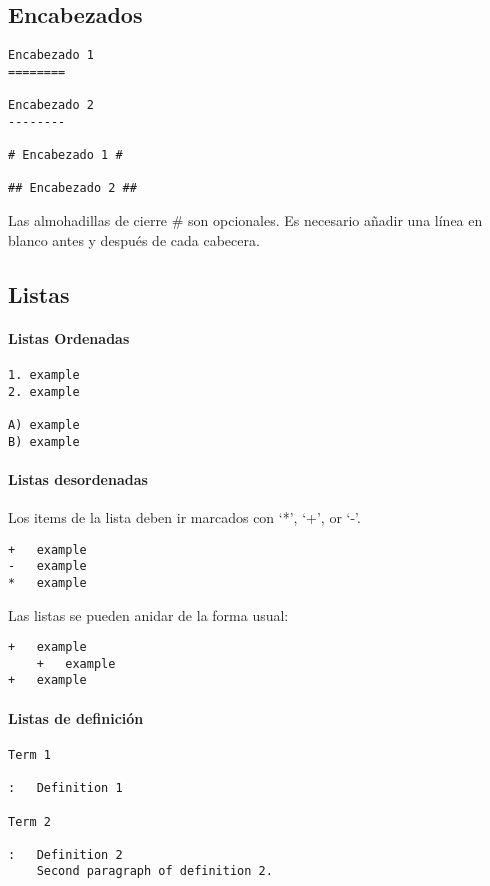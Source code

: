 \documentclass[12pt,es-ES,]{article}
\begin{document}
\subsection{Encabezados}\label{encabezados}

\begin{verbatim}
Encabezado 1
========

Encabezado 2
--------

# Encabezado 1 #

## Encabezado 2 ##
\end{verbatim}

Las almohadillas de cierre \# son opcionales. Es necesario añadir una
línea en blanco antes y después de cada cabecera.

\subsection{Listas}\label{listas}

\paragraph{Listas Ordenadas}\label{listas-ordenadas}

\begin{verbatim}
1. example
2. example

A) example
B) example
\end{verbatim}

\paragraph{Listas desordenadas}\label{listas-desordenadas}

Los items de la lista deben ir marcados con `*', `+', or `-'.

\begin{verbatim}
+   example
-   example
*   example
\end{verbatim}

Las listas se pueden anidar de la forma usual:

\begin{verbatim}
+   example
    +   example
+   example
\end{verbatim}

\paragraph{Listas de definición}\label{listas-de-definiciuxf3n}

\begin{verbatim}
Term 1

:   Definition 1

Term 2

:   Definition 2
    Second paragraph of definition 2.
\end{verbatim}
\end{document}
